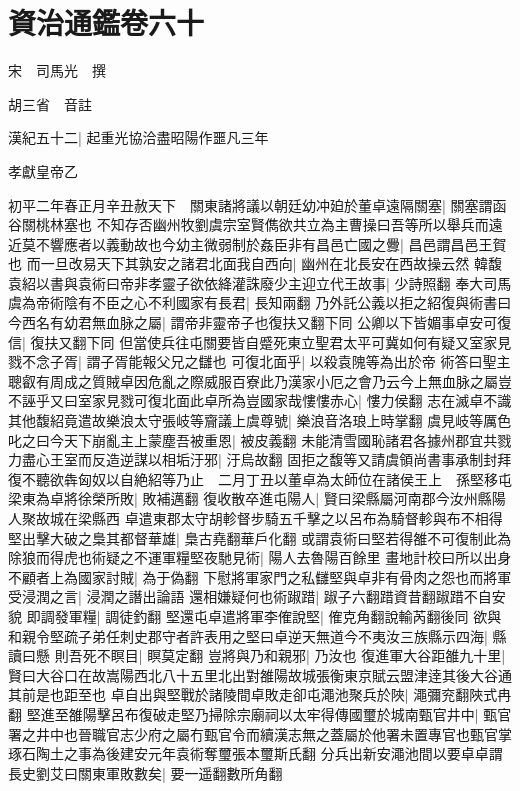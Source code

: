 \chapter{資治通鑑卷六十}
宋　司馬光　撰

胡三省　音註

漢紀五十二|{
	起重光協洽盡昭陽作噩凡三年}


孝獻皇帝乙

初平二年春正月辛丑赦天下　關東諸將議以朝廷幼冲廹於董卓遠隔關塞|{
	關塞謂函谷關桃林塞也}
不知存否幽州牧劉虞宗室賢儁欲共立為主曹操曰吾等所以舉兵而遠近莫不響應者以義動故也今幼主微弱制於姦臣非有昌邑亡國之釁|{
	昌邑謂昌邑王賀也}
而一旦改易天下其孰安之諸君北面我自西向|{
	幽州在北長安在西故操云然}
韓馥袁紹以書與袁術曰帝非孝靈子欲依絳灌誅廢少主迎立代王故事|{
	少詩照翻}
奉大司馬虞為帝術陰有不臣之心不利國家有長君|{
	長知兩翻}
乃外託公義以拒之紹復與術書曰今西名有幼君無血脉之屬|{
	謂帝非靈帝子也復扶又翻下同}
公卿以下皆媚事卓安可復信|{
	復扶又翻下同}
但當使兵往屯關要皆自蹙死東立聖君太平可冀如何有疑又室家見戮不念子胥|{
	謂子胥能報父兄之讎也}
可復北面乎|{
	以殺袁隗等為出於帝}
術答曰聖主聰叡有周成之質賊卓因危亂之際威服百寮此乃漢家小厄之會乃云今上無血脉之屬豈不誣乎又曰室家見戮可復北面此卓所為豈國家哉慺慺赤心|{
	慺力侯翻}
志在滅卓不識其他馥紹竟遣故樂浪太守張岐等齎議上虞尊號|{
	樂浪音洛琅上時掌翻}
虞見岐等厲色叱之曰今天下崩亂主上蒙塵吾被重恩|{
	被皮義翻}
未能清雪國恥諸君各據州郡宜共戮力盡心王室而反造逆謀以相垢汙邪|{
	汙烏故翻}
固拒之馥等又請虞領尚書事承制封拜復不聽欲犇匈奴以自絶紹等乃止　二月丁丑以董卓為太師位在諸侯王上　孫堅移屯梁東為卓將徐榮所敗|{
	敗補邁翻}
復收散卒進屯陽人|{
	賢曰梁縣屬河南郡今汝州縣陽人聚故城在梁縣西}
卓遣東郡太守胡軫督步騎五千擊之以呂布為騎督軫與布不相得堅出擊大破之梟其都督華雄|{
	梟古堯翻華戶化翻}
或謂袁術曰堅若得雒不可復制此為除狼而得虎也術疑之不運軍糧堅夜馳見術|{
	陽人去魯陽百餘里}
畫地計校曰所以出身不顧者上為國家討賊|{
	為于偽翻}
下慰將軍家門之私讎堅與卓非有骨肉之怨也而將軍受浸潤之言|{
	浸潤之譖出論語}
還相嫌疑何也術踧踖|{
	踧子六翻踖資昔翻踧踖不自安貌}
即調發軍糧|{
	調徒釣翻}
堅還屯卓遣將軍李傕說堅|{
	傕克角翻說輸芮翻後同}
欲與和親令堅疏子弟任刺史郡守者許表用之堅曰卓逆天無道今不夷汝三族縣示四海|{
	縣讀曰懸}
則吾死不瞑目|{
	瞑莫定翻}
豈將與乃和親邪|{
	乃汝也}
復進軍大谷距雒九十里|{
	賢曰大谷口在故嵩陽西北八十五里北出對雒陽故城張衡東京賦云盟津逹其後大谷通其前是也距至也}
卓自出與堅戰於諸陵間卓敗走卻屯澠池聚兵於陜|{
	澠彌兖翻陜式冉翻}
堅進至雒陽擊呂布復破走堅乃掃除宗廟祠以太牢得傳國璽於城南甄官井中|{
	甄官署之井中也晉職官志少府之屬冇甄官令而續漢志無之蓋屬於他署未置專官也甄官掌琢石陶土之事為後建安元年袁術奪璽張本璽斯氏翻}
分兵出新安澠池間以要卓卓謂長史劉艾曰關東軍敗數矣|{
	要一遥翻數所角翻}
